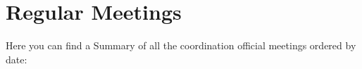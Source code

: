 \chapter{Regular Meetings}

 Here you can find a Summary of all the coordination official meetings ordered by date:


\newpage

\newpage

%


